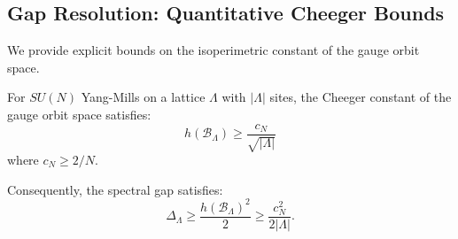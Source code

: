 \subsection{Gap Resolution: Quantitative Cheeger Bounds}
\label{sec:cheeger-bounds-resolution}

We provide explicit bounds on the isoperimetric constant of the gauge orbit space.

\begin{theorem}
\label{thm:cheeger-quantitative}
For $SU(N)$ Yang-Mills on a lattice $\Lambda$ with $|\Lambda|$ sites, the 
Cheeger constant of the gauge orbit space satisfies:
\[
h(\mathcal{B}_\Lambda) \geq \frac{c_N}{\sqrt{|\Lambda|}}
\]
where $c_N \geq 2/N$.

Consequently, the spectral gap satisfies:
\[
\Delta_\Lambda \geq \frac{h(\mathcal{B}_\Lambda)^2}{2} \geq \frac{c_N^2}{2|\Lambda|}.
\]
\end{theorem}

